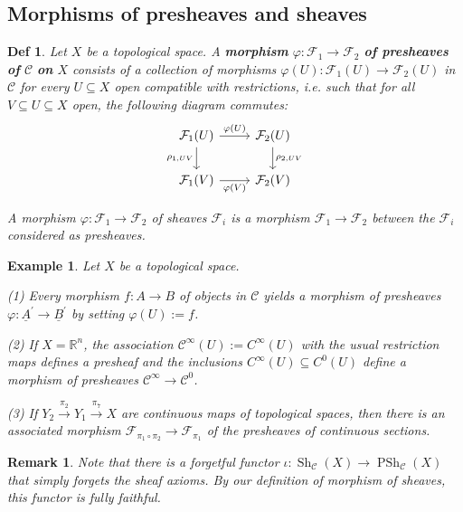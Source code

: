 \documentclass{article}
\newtheorem{definition}[theorem]{Def}
\newtheorem{example}[theorem]{Example}
\newtheorem{remark}[theorem]{Remark}
\begin{document}
\subsection{Morphisms of presheaves and sheaves}
\begin{definition}
    Let $X$ be a topological space. A \textbf{morphism} $\varphi: \mathcal{F}_{1} \rightarrow \mathcal{F}_{2}$ \textbf{of presheaves of} $\mathcal{C}$ \textbf{on} $X$ consists of a collection of morphisms $\varphi(U): \mathcal{F}_{1}(U) \rightarrow \mathcal{F}_{2}(U)$ in $\mathcal{C}$ for every $U \subseteq X$ open compatible with restrictions, i.e. such that for all $V \subseteq U \subseteq X$ open, the following diagram commutes:
    \[\begin{tikzcd}
	{\mathcal F_1(U)} & {\mathcal F_2(U)} \\
	{\mathcal F_1(V)} & {\mathcal F_2(V)}
	\arrow["{\varphi(V)}"', from=2-1, to=2-2]
	\arrow["{\rho_{1,UV}}"', from=1-1, to=2-1]
	\arrow["{\rho_{2,UV}}", from=1-2, to=2-2]
	\arrow["{\varphi(U)}", from=1-1, to=1-2]
\end{tikzcd}\]

    A morphism $\varphi: \mathcal{F}_{1} \rightarrow \mathcal{F}_{2}$ of sheaves $\mathcal{F}_{i}$ is a morphism $\mathcal{F}_{1} \rightarrow \mathcal{F}_{2}$ between the $\mathcal{F}_{i}$ considered as presheaves.
\end{definition}
\begin{example}
Let $X$ be a topological space.

(1) Every morphism $f: A \rightarrow B$ of objects in $\mathcal{C}$ yields a morphism of presheaves $\varphi: \underline{A}^{\prime} \rightarrow \underline{B}^{\prime}$ by setting $\varphi(U):=f$.

(2) If $X=\mathbb{R}^{n}$, the association $\mathcal{C}^{\infty}(U):=C^{\infty}(U)$ with the usual restriction maps defines a presheaf and the inclusions $C^{\infty}(U) \subseteq C^{0}(U)$ define a morphism of presheaves $\mathcal{C}^{\infty} \rightarrow \mathcal{C}^{0}$.

(3) If $Y_{2} \stackrel{\pi_{2}}{\rightarrow} Y_{1} \stackrel{\pi_{7}}{\rightarrow} X$ are continuous maps of topological spaces, then there is an associated morphism $\mathcal{F}_{\pi_{1} \circ \pi_{2}} \rightarrow \mathcal{F}_{\pi_{1}}$ of the presheaves of continuous sections.
\end{example}
\begin{remark}
    Note that there is a forgetful functor $\iota: \operatorname{Sh}_{\mathcal{C}}(X) \rightarrow \operatorname{PSh}_{\mathcal{C}}(X)$ that simply forgets the sheaf axioms. By our definition of morphism of sheaves, this functor is fully faithful.
\end{remark}
\end{document}
